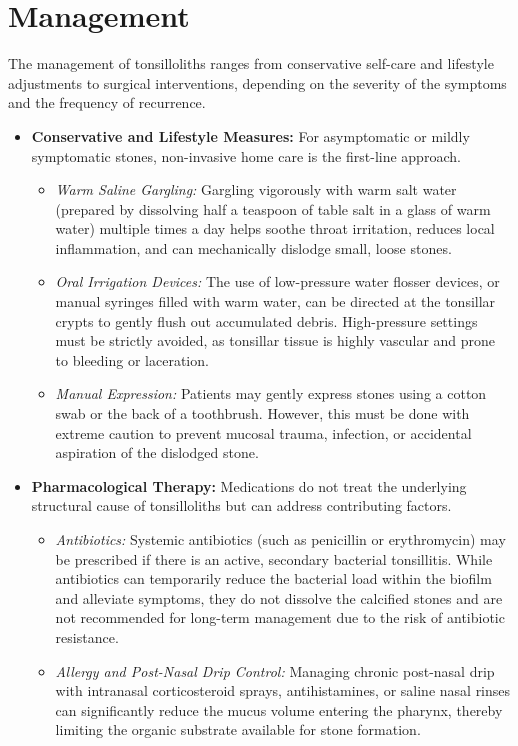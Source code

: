 \section*{Management}
The management of tonsilloliths ranges from conservative self-care and lifestyle adjustments to surgical interventions, depending on the severity of the symptoms and the frequency of recurrence.
\begin{itemize}
    \item \textbf{Conservative and Lifestyle Measures:} For asymptomatic or mildly symptomatic stones, non-invasive home care is the first-line approach.
    \begin{itemize}
        \item \textit{Warm Saline Gargling:} Gargling vigorously with warm salt water (prepared by dissolving half a teaspoon of table salt in a glass of warm water) multiple times a day helps soothe throat irritation, reduces local inflammation, and can mechanically dislodge small, loose stones.
        \item \textit{Oral Irrigation Devices:} The use of low-pressure water flosser devices, or manual syringes filled with warm water, can be directed at the tonsillar crypts to gently flush out accumulated debris. High-pressure settings must be strictly avoided, as tonsillar tissue is highly vascular and prone to bleeding or laceration.
        \item \textit{Manual Expression:} Patients may gently express stones using a cotton swab or the back of a toothbrush. However, this must be done with extreme caution to prevent mucosal trauma, infection, or accidental aspiration of the dislodged stone.
    \end{itemize}
    \item \textbf{Pharmacological Therapy:} Medications do not treat the underlying structural cause of tonsilloliths but can address contributing factors.
    \begin{itemize}
        \item \textit{Antibiotics:} Systemic antibiotics (such as penicillin or erythromycin) may be prescribed if there is an active, secondary bacterial tonsillitis. While antibiotics can temporarily reduce the bacterial load within the biofilm and alleviate symptoms, they do not dissolve the calcified stones and are not recommended for long-term management due to the risk of antibiotic resistance.
        \item \textit{Allergy and Post-Nasal Drip Control:} Managing chronic post-nasal drip with intranasal corticosteroid sprays, antihistamines, or saline nasal rinses can significantly reduce the mucus volume entering the pharynx, thereby limiting the organic substrate available for stone formation.

\end{itemize}
\end{itemize}
